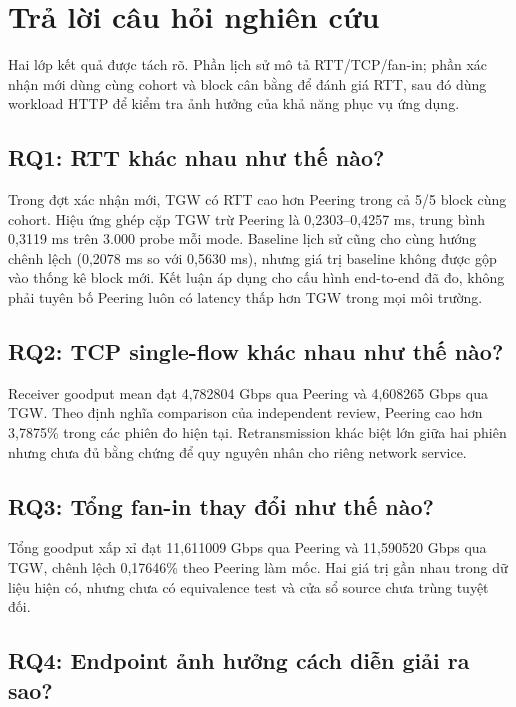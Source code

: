 \section{Trả lời câu hỏi nghiên cứu}

Hai lớp kết quả được tách rõ. Phần lịch sử mô tả RTT/TCP/fan-in; phần xác nhận
mới dùng cùng cohort và block cân bằng để đánh giá RTT, sau đó dùng workload
HTTP để kiểm tra ảnh hưởng của khả năng phục vụ ứng dụng.

\subsection{RQ1: RTT khác nhau như thế nào?}

Trong đợt xác nhận mới, TGW có RTT cao hơn Peering trong cả 5/5 block cùng
cohort. Hiệu ứng ghép cặp TGW trừ Peering là 0,2303--0,4257 ms, trung bình
0,3119 ms trên 3.000 probe mỗi mode. Baseline lịch sử cũng cho cùng hướng
chênh lệch (0,2078 ms so với 0,5630 ms), nhưng giá trị baseline không được gộp
vào thống kê block mới. Kết luận áp dụng cho cấu hình end-to-end đã đo, không
phải tuyên bố Peering luôn có latency thấp hơn TGW trong mọi môi trường.

\subsection{RQ2: TCP single-flow khác nhau như thế nào?}

Receiver goodput mean đạt 4,782804 Gbps qua Peering và 4,608265 Gbps qua TGW.
Theo định nghĩa comparison của independent review, Peering cao hơn 3,7875\%
trong các phiên đo hiện tại. Retransmission khác biệt lớn giữa hai phiên nhưng
chưa đủ bằng chứng để quy nguyên nhân cho riêng network service.

\subsection{RQ3: Tổng fan-in thay đổi như thế nào?}

Tổng goodput xấp xỉ đạt 11,611009 Gbps qua Peering và 11,590520 Gbps qua TGW,
chênh lệch 0,17646\% theo Peering làm mốc. Hai giá trị gần nhau trong dữ liệu
hiện có, nhưng chưa có equivalence test và cửa sổ source chưa trùng tuyệt đối.

\subsection{RQ4: Endpoint ảnh hưởng cách diễn giải ra sao?}

